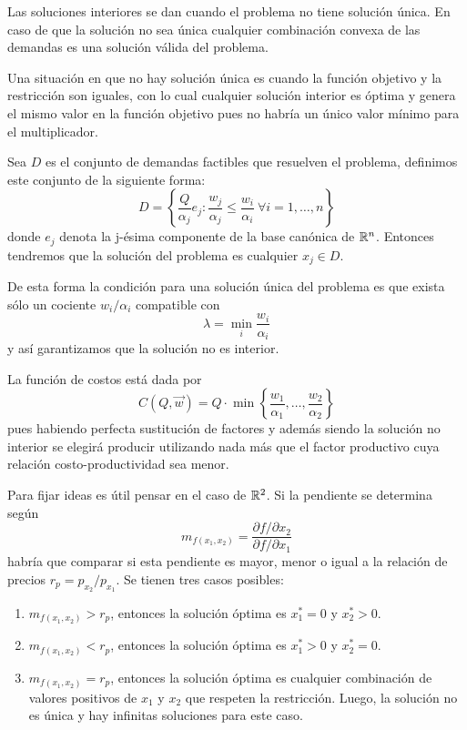 \begin{ejemplo}
Las soluciones interiores se dan cuando el problema no tiene soluci\'on \'unica. En caso de que la soluci\'on no sea \'unica cualquier combinaci\'on convexa de las demandas es una soluci\'on v\'alida del problema. 

Una situaci\'on en que no hay soluci\'on \'unica es cuando la funci\'on objetivo y la restricci\'on son iguales, con lo cual cualquier soluci\'on interior es \'optima y genera el mismo valor en la funci\'on objetivo pues no habr\'ia un \'unico valor m\'inimo para el multiplicador.

Sea $D$ es el conjunto de demandas factibles que resuelven el problema, definimos este conjunto de la siguiente forma:
$$D = \left\{\frac{Q}{\alpha_j} e_j : \frac{w_j}{\alpha_j} \leq \frac{w_i}{\alpha_i} \:\forall i=1,\ldots , n \right\}$$
donde $e_j$ denota la j-\'esima componente de la base can\'onica de $\mathbb{R}^n$. Entonces tendremos que la soluci\'on del problema es cualquier $x_j \in D$.

De esta forma la condici\'on para una soluci\'on \'unica del problema es que exista s\'olo un cociente $w_i / \alpha_i$ compatible con
$$\lambda = \min_i \frac{w_i}{\alpha_i}$$
y as\'i garantizamos que la soluci\'on no es interior. 

La funci\'on de costos est\'a dada por
$$C(Q,\vec{w}) = Q \cdot \min\left\{\frac{w_1}{\alpha_1},\ldots , \frac{w_2}{\alpha_2}\right\}$$
pues habiendo perfecta sustituci\'on de factores y adem\'as siendo la soluci\'on no interior se elegir\'a producir utilizando nada m\'as que el factor productivo cuya relaci\'on costo-productividad sea menor.

Para fijar ideas es \'util pensar en el caso de $\mathbb{R}^2$. Si la pendiente se determina seg\'un
$$m_{f(x_1,x_2)} = \frac{\partial f / \partial x_2}{\partial f / \partial x_1}$$
habr\'ia que comparar si esta pendiente es mayor, menor o igual a la relaci\'on de precios $r_p = p_{x_2}/p_{x_1}$. Se tienen tres casos posibles:

\begin{enumerate}
\item $m_{f(x_1,x_2)}>r_p$, entonces la soluci\'on \'optima es $x_1^*=0$ y $x_2^* > 0$.
\item $m_{f(x_1,x_2)}<r_p$, entonces la soluci\'on \'optima es $x_1^*>0$ y $x_2^* = 0$.
\item $m_{f(x_1,x_2)}=r_p$, entonces la soluci\'on \'optima es cualquier combinaci\'on de valores positivos de $x_1$ y $x_2$ que respeten la restricci\'on. Luego, la soluci\'on no es \'unica y hay infinitas soluciones para este caso.
\end{enumerate}
\end{ejemplo}

